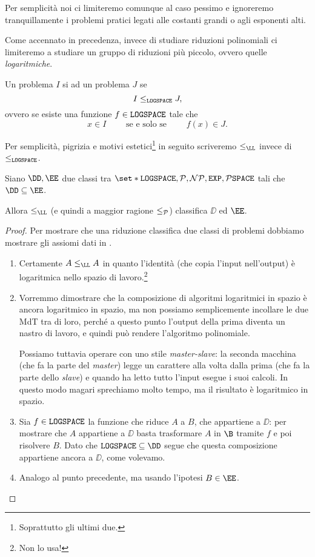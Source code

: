 Per semplicità noi ci limiteremo comunque al caso pessimo e ignoreremo
tranquillamente i problemi pratici legati alle costanti grandi o agli esponenti
alti.

Come accennato in precedenza, invece di studiare riduzioni polinomiali ci 
limiteremo a studiare un gruppo di riduzioni più piccolo, ovvero quelle 
\emph{logaritmiche}.

\begin{definition}
  Un problema $I$ si  ad un problema $J$ se \[
      I \leq_{\LOGSPACE} J,
  \] ovvero se esiste una funzione $f \in \LOGSPACE$ tale che \[
      x \in I \qquad\text{ se e solo se }\qquad f(x) \in J.
  \] 
\end{definition}

Per semplicità, pigrizia e motivi estetici\footnote{Soprattutto gli ultimi due.}
in seguito scriveremo $\leq_{\LL}$ invece di $\leq_{\LOGSPACE}$.

\begin{theorem}
  Siano $\DD, \EE$ due classi tra $\set*{\LOGSPACE, \P, \NP, \EXP, \PSPACE}$
  tali che $\DD \subseteq \EE$. 
  
  Allora $\leq_{\LL}$ (e quindi a maggior ragione $\leq_{\P}$) 
  classifica $\DD$ ed $\EE$.     
\end{theorem}
\begin{proof}
  Per mostrare che una riduzione classifica due classi di problemi dobbiamo
  mostrare gli assiomi dati in .
  \begin{enumerate}[(1)]
    \item Certamente $A \leq_{\LL} A$ in quanto l'identità (che copia l'input 
    nell'output) è logaritmica nello spazio di lavoro.\footnote{Non lo usa!}
    \item Vorremmo dimostrare che la composizione di algoritmi logaritmici in
    spazio è ancora logaritmico in spazio, ma non possiamo semplicemente incollare
    le due MdT tra di loro, perché a questo punto l'output della prima diventa
    un nastro di lavoro, e quindi può rendere l'algoritmo polinomiale.

    Possiamo tuttavia operare con uno stile \emph{master-slave}: la seconda
    macchina (che fa la parte del \emph{master}) legge un carattere alla volta
    dalla prima (che fa la parte dello \emph{slave}) e quando ha letto tutto
    l'input esegue i suoi calcoli. In questo modo magari sprechiamo molto tempo,
    ma il risultato è logaritmico in spazio.
    \item Sia $f \in \LOGSPACE$ la funzione che riduce $A$ a $B$, che appartiene
    a $\DD$: per mostrare che $A$ appartiene a $\DD$ basta trasformare $A$ in $\B$
    tramite $f$ e poi risolvere $B$. Dato che $\LOGSPACE \subseteq \DD$ segue che
    questa composizione appartiene ancora a $\DD$, come volevamo.
    \item Analogo al punto precedente, ma usando l'ipotesi $B \in \EE$.           
  \end{enumerate}
\end{proof}

